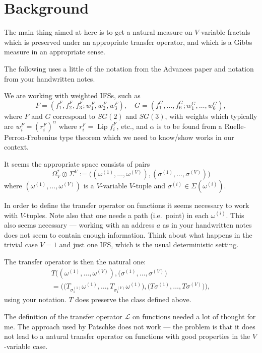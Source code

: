 \documentclass[a4paper]{amsart}
\theoremstyle{plain}
\theoremstyle{definition}
\theoremstyle{remark}
\DeclareMathOperator{\Lip}{Lip}
\begin{document}
\section{Background}

The main thing aimed at here is to get a natural measure on $ V $-variable fractals which is preserved under an appropriate transfer operator, and which is  a Gibbs measure in an appropriate sense.

\bigskip The following uses a little of the notation from the Advances paper and notation from your handwritten notes.

 \bigskip We are working with weighted IFSs, such as 
\[
F = (f^F_1,f^F_2,f^F_3; w_1^F,w_2^F,w_3^F), \quad G = (f^G_1,\dots,f^G_6; w_1^G,\dots,w_6^G),
\]
where $ F$ and $ G $ correspond to $ SG(2) $ and $ SG(3) $, with weights which typically are $ w_i^F = (r_i^F )^ \alpha $ where $ r_i^F =\Lip f^F_i $, etc., and $ \alpha $  is to be found from a Ruelle-Perron-Frobenius type theorem which we need to know/show works in our context.

It seems the appropriate space consists of pairs
\[
\Omega_V^* \oslash \Sigma^V :=
\big( (\omega^{(1)},\dots, \omega^{(V)}),  (\sigma^{(1)},\dots, \sigma^{(V)})\big)
\]
where $ 
 (\omega^{(1)},\dots, \omega^{(V)}) $
 is a $ V $-variable $ V $-tuple and   $ \sigma^{(i)} \in \Sigma(\omega^{(i)})$.  
 
In order to define the transfer operator on functions it seems necessary to work with $ V $-tuples.  Note also that one needs a path (i.e.\ point) in each $ \omega^{(i)} $.  This also seems necessary --- working with an address $ a $ as in your handwritten notes does not seem to contain enough information. Think about what happens in the trivial case $ V=1 $ and just one IFS, which is the usual deterministic setting.

The transfer operator is then the natural one:
\begin{equation} \label{dft}
\begin{gathered} 
T \big( (\omega^{(1)},\dots, \omega^{(V)}),  (\sigma^{(1)},\dots, \sigma^{(V)}\big) \\
 =
\Big( \big(T_{\sigma^{(1)}_1}\omega^{(1)},\dots, T_{\sigma^{(V)}_1}\omega^{(1)}\big),
\big(T\sigma^{(1)}, \dots, T\sigma^{(V)}\big)\Big),
\end{gathered}
\end{equation} 
using your notation.    $ T $ does preserve the class defined above.

\medskip 
The definition of the transfer operator $ \mathcal{L} $ on functions needed a lot of thought for me.  The approach used by Patschke does not work --- the problem is that it does not lead to a natural transfer operator on functions  with good properties in the $ V $-variable case.
\end{document}
